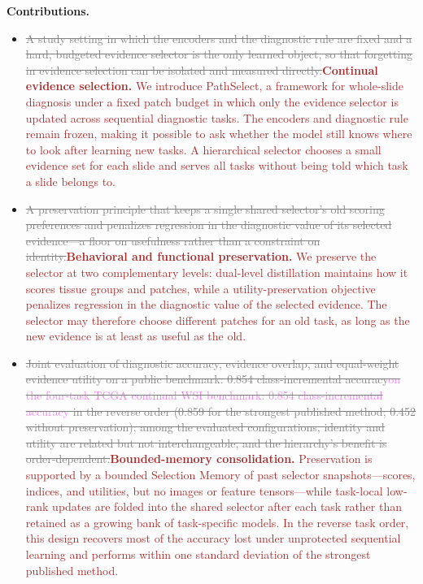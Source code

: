 \documentclass{article}
\newif\ifmarkup \markuptrue
\newcommand{\repc}[3]{\ifmarkup\textcolor{gray}{\sout{#2}}\textcolor{#1}{#3}\else#3\fi}
\newcommand{\repP}[2]{\repc{violet}{#1}{#2}}  %
\newcommand{\repB}[2]{\repc{brown}{#1}{#2}}   %
\begin{document}
\textbf{Contributions.}
\begin{itemize}
    \item \repB{A study setting in which the encoders and the diagnostic rule are fixed and a hard, budgeted evidence selector is the only learned object, so that forgetting in evidence selection can be isolated and measured directly.}{\textbf{Continual evidence selection.} We introduce PathSelect, a framework for whole-slide diagnosis under a fixed patch budget in which only the evidence selector is updated across sequential diagnostic tasks. The encoders and diagnostic rule remain frozen, making it possible to ask whether the model still knows where to look after learning new tasks. A hierarchical selector chooses a small evidence set for each slide and serves all tasks without being told which task a slide belongs to.}
    \item \repB{A preservation principle that keeps a single shared selector's old scoring preferences and penalizes regression in the diagnostic value of its selected evidence---a floor on usefulness rather than a constraint on identity.}{\textbf{Behavioral and functional preservation.} We preserve the selector at two complementary levels: dual-level distillation maintains how it scores tissue groups and patches, while a utility-preservation objective penalizes regression in the diagnostic value of the selected evidence. The selector may therefore choose different patches for an old task, as long as the new evidence is at least as useful as the old.}
    \item \repB{Joint evaluation of diagnostic accuracy, evidence overlap, and equal-weight evidence utility \repP{on a public benchmark: 0.854 class-incremental accuracy}{on the four-task TCGA continual WSI benchmark: 0.854 class-incremental accuracy} in the reverse order (0.859 for the strongest published method; 0.452 without preservation); among the evaluated configurations, identity and utility are related but not interchangeable, and the hierarchy's benefit is order-dependent.}{\textbf{Bounded-memory consolidation.} Preservation is supported by a bounded Selection Memory of past selector snapshots---scores, indices, and utilities, but no images or feature tensors---while task-local low-rank updates are folded into the shared selector after each task rather than retained as a growing bank of task-specific models. In the reverse task order, this design recovers most of the accuracy lost under unprotected sequential learning and performs within one standard deviation of the strongest published method.}
\end{itemize}
\end{document}
